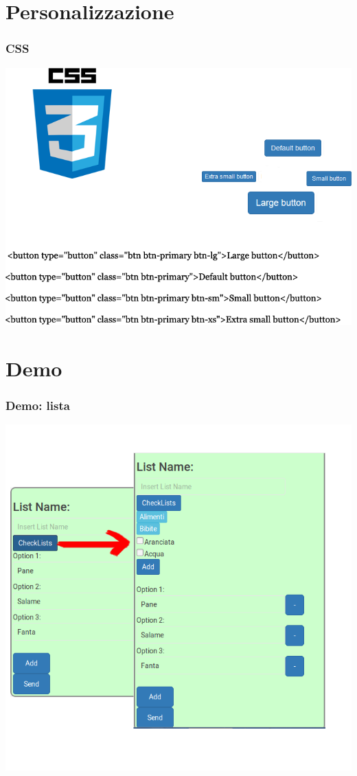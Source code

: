 \section{Personalizzazione}
\begin{frame}
	\frametitle{CSS}
	\includegraphics[scale=0.50]{img/css.png}
\end{frame}

\section{Demo}
\begin{frame}
	\frametitle{Demo: lista}
	\includegraphics[scale=0.25]{img/demo.png}
\end{frame}
